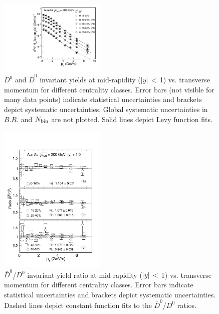 \documentclass[%
 reprint,	
 amsmath,amssymb,
 aps,
 prc,
]{revtex4-1}
\begin{document}
\begin{figure}
\centering
\includegraphics[width=0.45\textwidth]{fig/D0_spectra_bothposneg.pdf}
\caption{$D^{0}$ and $\overline{D}^{0}$ invariant yields at mid-rapidity ($|y|$\,$<$\,1) vs. transverse momentum for different centrality classes. Error bars (not visible for many data points) indicate statistical uncertainties and brackets depict systematic uncertainties. Global systematic uncertainties in $B.R.$ and $N_{\rm bin}$ are not plotted. Solid lines depict Levy function fits.}
\label{fig:D0_spectra_bothposneg} 
\end{figure}

\begin{figure}
\centering
\includegraphics[width=0.45\textwidth]{fig/D0_spectra_ratioposneg_fit.pdf}
\caption{$\overline{D}^{0}$/$D^{0}$ invariant yield ratio at mid-rapidity ($|y|$\,$<$\,1) vs. transverse momentum for different centrality classes. Error bars indicate statistical uncertainties and brackets depict systematic uncertainties. Dashed lines depict constant function fits to the $\overline{D}^{0}$/$D^{0}$ ratios.}
\label{fig:D0_spectra_ratioposneg} 
\end{figure}
\end{document}
